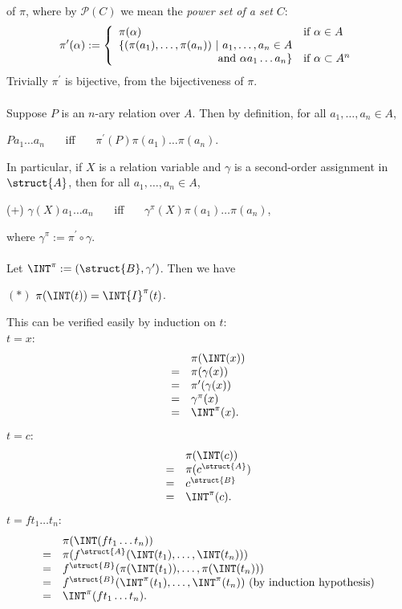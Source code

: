 \begin{enumerate}[1.]
\begin{enumerate}[(1)]
\[\]
of $\pi$, where by $\mathcal{P}(C)$ we mean the \emph{power set of a set $C$}:
\[
\pi^\prime (\alpha) := \left\{
\begin{array}{ll}
\pi (\alpha)                                                   & \mbox{if $\alpha \in A$} \cr
\{ ( \pi (a_1), \ldots, \pi (a_n) ) \ | \ \mbox{$a_1, \ldots, a_n \in A$} & \cr
\multicolumn{1}{r}{\mbox{and $\alpha a_1 \ldots a_n$} \}}      & \mbox{if $\alpha \subset A^n$}
\end{array} \right.
\]
Trivially $\pi^\prime$ is bijective, from the bijectiveness of $\pi$.\\
\\
Suppose $P$ is an $n$-ary relation over $A$. Then by definition, for all $a_1, \ldots, a_n \in A$,
\begin{center}
$Pa_1 \ldots a_n$ \ \ \ iff \ \ \ $\pi^\prime (P) \pi (a_1) \ldots \pi (a_n)$.
\end{center}
In particular, if $X$ is a relation variable and $\gamma$ is a second-order assignment in $\struct{A}$, then for all $a_1, \ldots, a_n \in A$,
\begin{center}
(+) \hfill $\gamma (X) a_1 \ldots a_n$ \ \ \ iff \ \ \ $\gamma^\pi (X) \pi (a_1) \ldots \pi (a_n)$, \hfill \phantom{(+)}
\end{center}
where $\gamma^\pi := \pi^\prime \circ \gamma$.\\
\ \\
Let $\INT^\pi := (\struct{B}, \gamma^\prime)$. Then we have
\begin{center}
$(*)$ \hfill $\pi(\INT(t)) = \INT{I}^\pi(t)$. \hfill \phantom{(*)}
\end{center}
This can be verified easily by induction on $t$:\\
$t = x$:
\[
\begin{array}{ll}
\ & \pi(\INT(x)) \cr
= & \pi(\gamma(x)) \cr
= & \pi^\prime(\gamma(x)) \cr
= & \gamma^\pi(x) \cr
= & \INT^\pi(x).
\end{array}
\]
$t = c$:
\[
\begin{array}{ll}
\ & \pi(\INT(c)) \cr
= & \pi(c^\struct{A}) \cr
= & c^\struct{B} \cr
= & \INT^\pi(c).
\end{array}
\]
$t = f t_1 \ldots t_n$:
\[
\begin{array}{ll}
\ & \pi(\INT(f t_1 \ldots t_n)) \cr
= & \pi(f^\struct{A} (\INT(t_1), \ldots, \INT(t_n))) \cr
= & f^\struct{B} (\pi(\INT(t_1)), \ldots, \pi(\INT(t_n))) \cr
= & f^\struct{B} (\INT^\pi(t_1), \ldots, \INT^\pi(t_n)) \ \mbox{(by induction hypothesis)} \cr
= & \INT^\pi(f t_1 \ldots t_n).
\end{array}
\]
\end{enumerate}
\end{enumerate}
